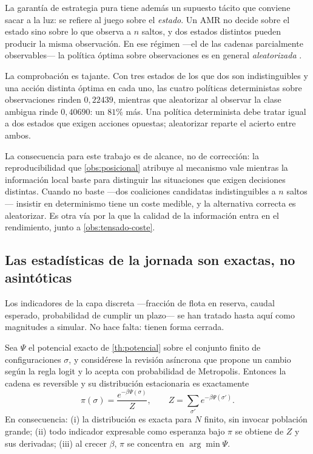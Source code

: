 \begin{observacion}
\label{obs:pura-observacion}
La garantía de estrategia pura tiene además un supuesto tácito que conviene
sacar a la luz: se refiere al juego sobre el \emph{estado}. Un AMR no decide
sobre el estado sino sobre lo que observa a $n$ saltos, y dos estados distintos
pueden producir la misma observación. En ese régimen —el de las cadenas
parcialmente observables— la política óptima sobre observaciones es en general
\emph{aleatorizada} \cite{clempner2024optimization}.

La comprobación es tajante. Con tres estados de los que dos son indistinguibles
y una acción distinta óptima en cada uno, las cuatro políticas deterministas
sobre observaciones rinden $0{,}22439$, mientras que aleatorizar al observar la
clase ambigua rinde $0{,}40690$: un $81\%$ más. Una política determinista debe
tratar igual a dos estados que exigen acciones opuestas; aleatorizar reparte el
acierto entre ambos.

La consecuencia para este trabajo es de alcance, no de corrección: la
reproducibilidad que \cref{obs:posicional} atribuye al mecanismo vale mientras la
información local baste para distinguir las situaciones que exigen decisiones
distintas. Cuando no baste —dos coaliciones candidatas indistinguibles a $n$
saltos— insistir en determinismo tiene un coste medible, y la alternativa
correcta es aleatorizar. Es otra vía por la que la calidad de la información
entra en el rendimiento, junto a \cref{obs:tensado-coste}.
\end{observacion}

\subsection{Las estadísticas de la jornada son exactas, no asintóticas}

Los indicadores de la capa discreta —fracción de flota en reserva, caudal
esperado, probabilidad de cumplir un plazo— se han tratado hasta aquí como
magnitudes a simular. No hace falta: tienen forma cerrada.

\begin{teorema}
\label{th:gibbs}
Sea $\Psi$ el potencial exacto de \cref{th:potencial} sobre el conjunto finito
de configuraciones $\sigma$, y considérese la revisión asíncrona que propone un
cambio según la regla logit y lo acepta con probabilidad de Metropolis. Entonces
la cadena es reversible y su distribución estacionaria es exactamente
\[
  \pi(\sigma)=\frac{e^{-\beta\Psi(\sigma)}}{Z},
  \qquad Z=\sum_{\sigma'}e^{-\beta\Psi(\sigma')} .
\]
En consecuencia: (i) la distribución es exacta para $N$ finito, sin invocar
población grande; (ii) todo indicador expresable como esperanza bajo $\pi$ se
obtiene de $Z$ y sus derivadas; (iii) al crecer $\beta$, $\pi$ se concentra en
$\arg\min\Psi$.
\end{teorema}

